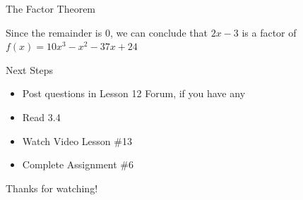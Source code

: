 \documentclass[t]{beamer}
\begin{document}
	\begin{frame}{The Factor Theorem}
		
		\pause
		
		Since the remainder is $0$, we can conclude that $2x - 3$ is a factor of $f(x) = 10x^3 - x^2 - 37x + 24$
	\end{frame}

	\begin{frame}{Next Steps}
	\begin{itemize}
		\item Post questions in Lesson 12 Forum, if you have any
		\item Read 3.4
		\item Watch Video Lesson \#13
		\item Complete Assignment \#6
	\end{itemize}

	\vfill
	
	Thanks for watching!
	\end{frame}
\end{document}
